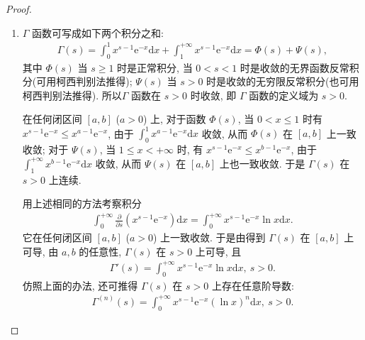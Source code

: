 \documentclass[../../main.tex]{subfiles}%
\begin{document}
\begin{proof}
\begin{enumerate}[(1)]
\item $\Gamma$ 函数可写成如下两个积分之和:
\begin{align*}
\Gamma(s) = \int_{0}^{1} x^{s-1} \mathrm{e}^{-x} \mathrm{d}x + \int_{1}^{+\infty} x^{s-1} \mathrm{e}^{-x} \mathrm{d}x = \Phi(s) + \Psi(s),
\end{align*}
其中 $\Phi(s)$ 当 $s\geqslant 1$ 时是正常积分, 当 $0<s<1$ 时是收敛的无界函数反常积分(可用柯西判别法推得); $\Psi(s)$ 当 $s>0$ 时是收敛的无穷限反常积分(也可用柯西判别法推得). 所以$\Gamma$ 函数在 $s>0$ 时收敛, 即 $\Gamma$ 函数的定义域为 $s>0$.

在任何闭区间 $[a,b]$ ($a>0$) 上, 对于函数 $\Phi(s)$, 当 $0<x\leqslant 1$ 时有 $x^{s-1} \mathrm{e}^{-x} \leqslant x^{a-1} \mathrm{e}^{-x}$, 由于 $\int_{0}^{1} x^{a-1} \mathrm{e}^{-x} \mathrm{d}x$ 收敛, 从而 $\Phi(s)$ 在 $[a,b]$ 上一致收敛; 对于 $\Psi(s)$, 当 $1\leqslant x<+\infty$ 时, 有 $x^{s-1} \mathrm{e}^{-x} \leqslant x^{b-1} \mathrm{e}^{-x}$, 由于 $\int_{1}^{+\infty} x^{b-1} \mathrm{e}^{-x} \mathrm{d}x$ 收敛, 从而 $\Psi(s)$ 在 $[a,b]$ 上也一致收敛. 于是 $\Gamma(s)$ 在 $s>0$ 上连续.

用上述相同的方法考察积分
\begin{align*}
\int_{0}^{+\infty} \frac{\partial}{\partial s}\left(x^{s-1} \mathrm{e}^{-x}\right) \mathrm{d}x = \int_{0}^{+\infty} x^{s-1} \mathrm{e}^{-x} \ln x \mathrm{d}x.
\end{align*}
它在任何闭区间 $[a,b]$ ($a>0$) 上一致收敛. 于是由得到 $\Gamma(s)$ 在 $[a,b]$ 上可导, 由 $a,b$ 的任意性, $\Gamma(s)$ 在 $s>0$ 上可导, 且
\begin{align*}
\Gamma'(s) = \int_{0}^{+\infty} x^{s-1} \mathrm{e}^{-x} \ln x \mathrm{d}x,\ s > 0.
\end{align*}
仿照上面的办法, 还可推得 $\Gamma(s)$ 在 $s>0$ 上存在任意阶导数:
\begin{align*}
\Gamma^{(n)}(s) = \int_{0}^{+\infty} x^{s-1} \mathrm{e}^{-x} (\ln x)^n \mathrm{d}x,\ s > 0.
\end{align*}


\end{enumerate}
\end{proof}
\end{document}
